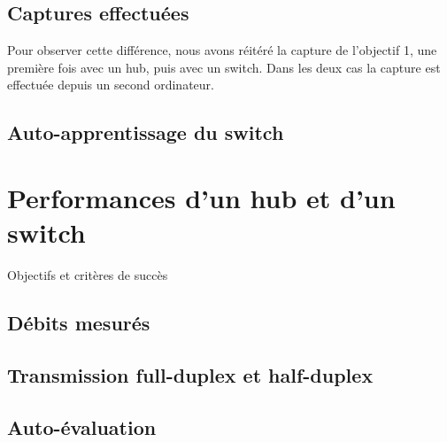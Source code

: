 \documentclass[11pt,a4paper]{article}
\begin{document}
\subsection{Captures effectuées}

Pour observer cette différence, nous avons réitéré la capture de l'objectif 1, une première fois avec un hub, puis avec un switch. Dans les deux cas la capture est effectuée depuis un second ordinateur.

\subsection{Auto-apprentissage du switch}



\section{Performances d'un hub et d'un switch}

Objectifs et critères de succès

\subsection{Débits mesurés}

\subsection{Transmission full-duplex et half-duplex}

\subsection{Auto-évaluation}
\end{document}
